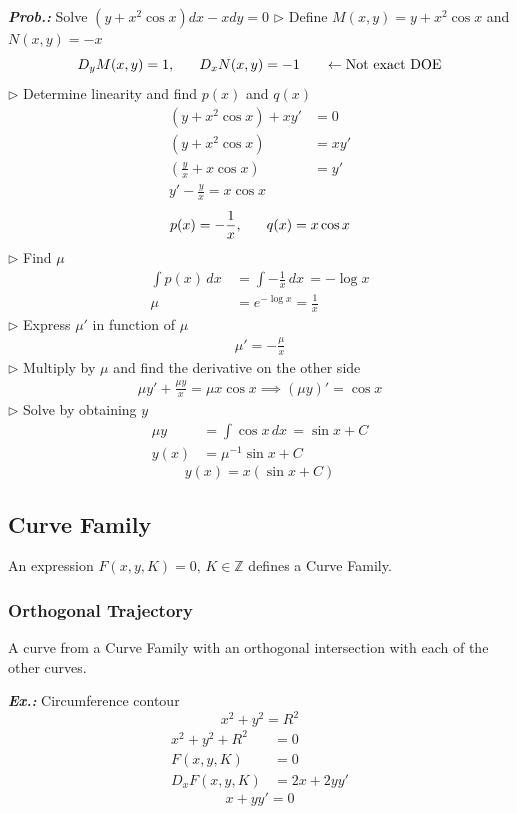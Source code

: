 \documentclass[a4paper]{article}
\begin{document}
\vspace{2ex}\textbf{\textit{Prob.: }}Solve $(y+x^{2}\cos x)dx-xdy=0$ 
$\triangleright$ Define $M(x,y)=y+x^{2}\cos x$ and $N(x,y)=-x$
$$
D_{y}M(x,y)=1,\hspace{4ex}D_{x}N(x,y)=-1 \hspace{4ex}\leftarrow\text{Not exact DOE}
$$
$\triangleright$ Determine linearity and find $p(x)$ and $q(x)$
\begin{align}
(y+x^{2}\cos x)+xy'&=0 \\
(y+x^{2}\cos x)&=xy' \\
\left( \frac{y}{x}+x\cos x \right)&=y' \\
y'-\frac{y}{x}=x\cos x
\end{align}
$$
p(x)=-\frac{1}{x},\hspace{4ex}q(x)=x\cos x
$$
$\triangleright$ Find $\mu$
\begin{align}
\int p(x) \, dx\, &=\int -\frac{1}{x} \, dx\, =-\log x \\
\mu&=e^{ -\log x }=\frac{1}{x}
\end{align}
$\triangleright$ Express $\mu'$ in function of $\mu$
\begin{align}
\mu'=-\frac{\mu}{x}
\end{align}
$\triangleright$ Multiply by $\mu$ and find the derivative on the other side
\begin{align}
\mu y'+\frac{\mu y}{x}=\mu x\cos x \implies (\mu y)'=\cos x
\end{align}
$\triangleright$ Solve by obtaining $y$
\begin{align}
\mu y&=\int \cos x \, dx\, =\sin x+C  \\
y(x)&=\mu^{-1}\sin x+C
\end{align}
$$
\boxed{y(x)=x(\sin x+C)}
$$
\subsection{Curve Family}
An expression $F(x,y,K)=0,\,K\in\mathbb{Z}$ defines a Curve Family.

\subsubsection{Orthogonal Trajectory}
A curve from a Curve Family with an orthogonal intersection with each of the other curves.



\vspace{2ex}\textbf{\textit{Ex.: }}Circumference contour
$$
x^{2}+y^{2}=R^{2}
$$
\begin{align}
x^{2}+y^{2}+R^{2}&=0 \\
F(x,y,K)&=0 \\
D_{x}F(x,y,K)&=2x+2yy'
\end{align}
$$
\boxed{x+yy'=0}
$$
\vspace{1ex}\vspace{1ex}
\end{document}
